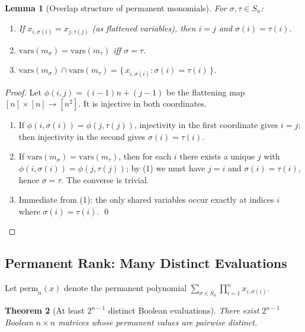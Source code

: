 \documentclass[12pt]{article}
\newtheorem{theorem}{Theorem}
\newtheorem{lemma}[theorem]{Lemma}
\theoremstyle{definition}
\theoremstyle{definition}
\theoremstyle{remark}
\theoremstyle{remark}
\begin{document}
\begin{lemma}[Overlap structure of permanent monomials]
\label{lem:perm-overlap}
For $\sigma, \tau \in S_n$:
\begin{enumerate}
\item If $x_{i,\sigma(i)} = x_{j,\tau(j)}$ (as flattened variables), then $i = j$ and $\sigma(i) = \tau(i)$.
\item $\mathrm{vars}(m_\sigma) = \mathrm{vars}(m_\tau)$ iff $\sigma = \tau$.
\item $\mathrm{vars}(m_\sigma) \cap \mathrm{vars}(m_\tau) = \{\, x_{i,\sigma(i)} : \sigma(i) = \tau(i) \,\}$.
\end{enumerate}
\end{lemma}

\begin{proof}
Let $\phi(i,j) = (i-1)n + (j-1)$ be the flattening map $[n] \times [n] \to [n^2]$. It is injective in both coordinates.
\begin{enumerate}
\item If $\phi(i,\sigma(i)) = \phi(j,\tau(j))$, injectivity in the first coordinate gives $i = j$; then injectivity in the second gives $\sigma(i) = \tau(i)$.
\item If $\mathrm{vars}(m_\sigma) = \mathrm{vars}(m_\tau)$, then for each $i$ there exists a unique $j$ with $\phi(i,\sigma(i)) = \phi(j,\tau(j))$; by (1) we must have $j = i$ and $\sigma(i) = \tau(i)$, hence $\sigma = \tau$. The converse is trivial.
\item Immediate from (1): the only shared variables occur exactly at indices $i$ where $\sigma(i) = \tau(i)$. \qed
\end{enumerate}
\end{proof}

\subsection{Permanent Rank: Many Distinct Evaluations}

Let $\mathrm{perm}_n(x)$ denote the permanent polynomial $\sum_{\sigma \in S_n} \prod_{i=1}^n x_{i,\sigma(i)}$.

\begin{theorem}[At least $2^{n-1}$ distinct Boolean evaluations]
\label{thm:perm-distinct-values}
There exist $2^{n-1}$ Boolean $n \times n$ matrices whose permanent values are pairwise distinct.
\end{theorem}
\end{document}
